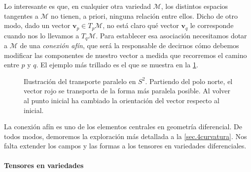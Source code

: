 Lo interesante es que, en cualquier otra variedad \(\mathcal{M}\), los distintos espacios tangentes a \(\mathcal{M}\) no tienen, a priori, ninguna relación entre ellos. Dicho de otro modo, dado un vector \(\mathbf{v}_p\in T_p\mathcal{M}\), no está claro qué vector \(\mathbf{v}_q\) le corresponde cuando nos lo llevamos a \(T_q\mathcal{M}\). Para establecer esa asociación necesitamos dotar a \(\mathcal{M}\) de una \emph{conexión afín}, que será la responsable de decirnos cómo debemos modificar las componentes de nuestro vector a medida que recorremos el camino entre \(p\) y \(q\). El ejemplo más trillado es el que se muestra en la \cref{fig.3-transporte_S2}.

\begin{figure}[htbp]
    \centering
    
    \caption{Ilustración del transporte paralelo en \(S^2\). Partiendo del polo norte, el vector rojo se transporta de la forma más paralela posible. Al volver al punto inicial ha cambiado la orientación del vector respecto al inicial.}
    \label{fig.3-transporte_S2}
\end{figure}

La conexión afín es uno de los elementos centrales en geometría diferencial. De todos modos, demoremos la exploración más detallada a la \cref{sec.4curvatura}. Nos falta extender los campos y las formas a los tensores en variedades diferenciales.

\paragraph{Tensores en variedades}


